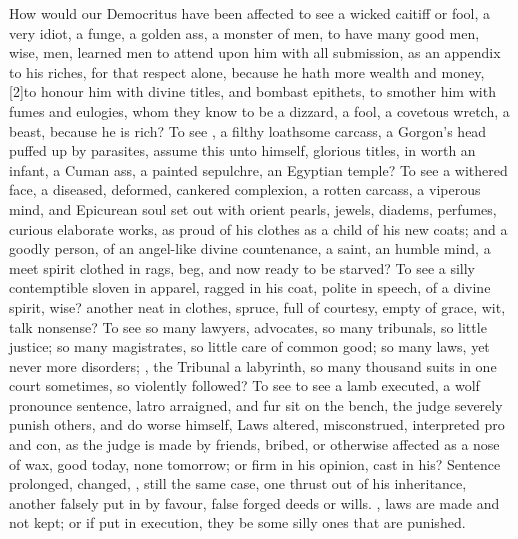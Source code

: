 {How would our Democritus have been affected to see a wicked caitiff or
fool, a very idiot, a funge, a golden ass, a monster of men, to
have many good men, wise, men, learned men to attend upon him with all
submission, as an appendix to his riches, for that respect alone,
because he hath more wealth and money, [2\baselineskip]to honour him with divine
titles, and bombast epithets, to smother him with fumes and eulogies,
whom they know to be a dizzard, a fool, a covetous wretch, a beast, \etc{}
because he is rich? To see , a filthy
loathsome carcass, a Gorgon's head puffed up by parasites, assume this
unto himself, glorious titles, in worth an infant, a Cuman ass, a
painted sepulchre, an Egyptian temple? To see a withered face, a
diseased, deformed, cankered complexion, a rotten carcass, a viperous
mind, and Epicurean soul set out with orient pearls, jewels, diadems,
perfumes, curious elaborate works, as proud of his clothes as a child
of his new coats; and a goodly person, of an angel-like divine
countenance, a saint, an humble mind, a meet spirit clothed in rags,
beg, and now ready to be starved? To see a silly contemptible sloven in
apparel, ragged in his coat, polite in speech, of a divine spirit,
wise? another neat in clothes, spruce, full of courtesy, empty of
grace, wit, talk nonsense?
To see so many lawyers, advocates, so many tribunals, so little
justice; so many magistrates, so little care of common good; so many
laws, yet never more disorders; , the Tribunal a
labyrinth, so many thousand suits in one court sometimes, so violently
followed? To see  to see a lamb executed, a wolf pronounce sentence,
latro arraigned, and fur sit on the bench, the judge severely punish
others, and do worse himself,   Laws altered,
misconstrued, interpreted pro and con, as the judge is made by
friends, bribed, or otherwise affected as a nose of wax, good today,
none tomorrow; or firm in his opinion, cast in his? Sentence prolonged,
changed, , still the same case, one thrust out
of his inheritance, another falsely put in by favour, false forged
deeds or wills. , laws are made and not kept;
or if put in execution, they be some silly ones that are punished.

}
